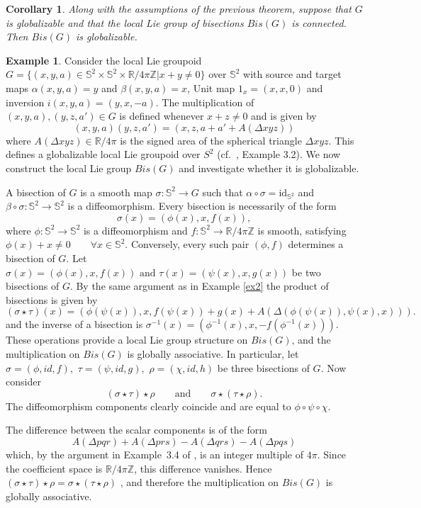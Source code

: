 \documentclass[12pt,a4paper]{amsart}
\theoremstyle{plain}
\newtheorem{corollary}[theorem]{Corollary}
\theoremstyle{definition}
\newtheorem{example}[theorem]{Example}
\begin{document}
\begin{corollary}
Along with the assumptions of the previous theorem, suppose that $G$ is globalizable and that the local Lie group of bisections $Bis(G)$ is connected. Then $Bis(G)$ is globalizable.
\end{corollary}

\begin{example}
Consider the local Lie groupoid  $G=\{(x,y,a)\in \mathbb{S}^{2}\times \mathbb{S}^2\times \mathbb{R}/4\pi\mathbb{Z}|x+y\neq0\}$ over $\mathbb{S}^2$ with source and target maps $\alpha(x,y,a)=y$ and $\beta(x,y,a)=x$, Unit map $1_x=(x,x,0)$ and inversion $i(x,y,a)=(y,x,-a)$. The multiplication of $(x,y,a),(y,z,a')\in G$ is defined whenever $x+z\neq 0$ and is given by $$(x,y,a)(y,z,a')=(x,z,a+a'+A(\Delta xyz))$$ where  $A(\Delta xyz)\in \mathbb{R}/4\pi$ is the signed area of the spherical triangle $\Delta xyz$. This defines a globalizable local Lie groupoid over $S^2$ (cf.~\cite{Fernandes}, Example 3.2).
We now construct the local Lie group $Bis(G)$ and investigate whether it is globalizable.

A bisection of $G$ is a smooth map
$\sigma:\mathbb S^2\to G$
such that
$\alpha\circ\sigma=\mathrm{id}_{\mathbb S^2}$ 
and
$\beta\circ\sigma:\mathbb S^2\to \mathbb S^2$
is a diffeomorphism.
Every bisection is necessarily of the form
\[
\sigma(x)=(\phi(x),x,f(x)),
\]
where $\phi:\mathbb S^2\to \mathbb S^2$
is a diffeomorphism and
$f:\mathbb S^2\to \mathbb R/4\pi\mathbb Z$
is smooth, satisfying
$\phi(x)+x\neq 0
\qquad
\forall x\in \mathbb S^2$. Conversely, every such pair $(\phi,f)$ determines a bisection of $G$.
Let $\sigma(x)=(\phi(x),x,f(x))
\,\, \text{and}\,\,
\tau(x)=(\psi(x),x,g(x))$ 
be two bisections of $G$. By the same argument as in Example \ref{ex2} the product of bisections is given by
\[
(\sigma\star\tau)(x)
=
(\phi(\psi(x)),x,
f(\psi(x))+g(x)+A(\Delta(\phi(\psi(x)),\psi(x),x))).
\]
and the inverse of a bisection is       
$\sigma^{-1}(x)
=
(\phi^{-1}(x),x,-f(\phi^{-1}(x)))$.
These operations provide a local Lie group structure on $Bis(G)$, and the multiplication on $Bis(G)$ is globally associative. In particular, let
$\sigma=(\phi,id,f),\,\,
\tau=(\psi,id,g),\,\,
\rho=(\chi,id,h)$ 
be three bisections of $G$.
Now consider
\[
(\sigma\star\tau)\star\rho
\qquad\text{and}\qquad
\sigma\star(\tau\star\rho).
\]
The diffeomorphism components clearly coincide and are equal to
$\phi\circ\psi\circ\chi$.

The difference between the scalar components is of the form
\[
A(\Delta pqr)
+
A(\Delta prs)
-
A(\Delta qrs)
-
A(\Delta pqs)
\]
which, by the argument in Example~3.4 of \cite{Fernandes}, is an integer multiple of $4\pi$. Since the coefficient space is
$\mathbb R/4\pi\mathbb Z$,
this difference vanishes. Hence
$ (\sigma\star\tau)\star\rho
=
\sigma\star(\tau\star\rho)$ ,
and therefore the multiplication on $Bis(G)$ is globally associative.

\end{example}
\end{document}

